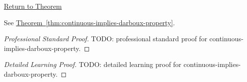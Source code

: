 \newpage
{}
\label{prf:continuous-implies-darboux-property}

\begin{remark*}[Return]
\hyperref[thm:continuous-implies-darboux-property]{Return to Theorem}
\end{remark*}

\begin{theorem*}
See \hyperref[thm:continuous-implies-darboux-property]{Theorem~\ref*{thm:continuous-implies-darboux-property}}.
\end{theorem*}

\begin{proof}[Professional Standard Proof]
\LRAProofBodyStart
TODO: professional standard proof for continuous-implies-darboux-property.
\end{proof}

\begin{proof}[Detailed Learning Proof]
\LRAProofBodyStart
TODO: detailed learning proof for continuous-implies-darboux-property.
\end{proof}

\begin{remark*}
\end{remark*}

\begin{dependencies}
\NoLocalDependencies
\end{dependencies}

\clearpage

